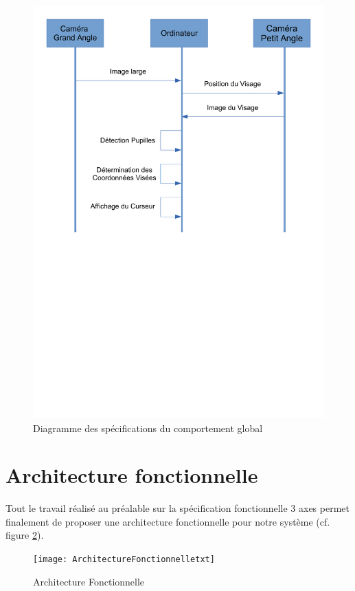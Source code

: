 \begin{figure}[h]
  \centering
  \includegraphics[scale=0.6]{comportementGlobal}
  \caption{Diagramme des spécifications du comportement global}
  \label{fig:comportementGlobal}
\end{figure}

\section{Architecture fonctionnelle}

Tout le travail réalisé au préalable sur la spécification fonctionnelle 3 axes permet finalement de proposer une architecture fonctionnelle pour notre système (cf. figure \ref{fig:archiFonctionnelle}).
 
\begin{figure}[h]
  \centering
  \texttt{[image: ArchitectureFonctionnelletxt]}
  \caption{Architecture Fonctionnelle}
  \label{fig:archiFonctionnelle}
\end{figure}

